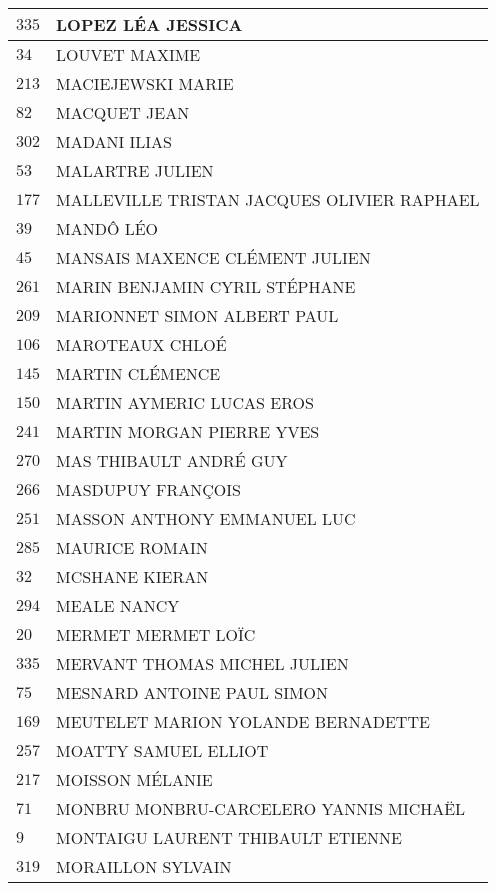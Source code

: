 \begin{xltabular}{\linewidth}{|l|X|}
    \hline
    $335$ & LOPEZ LÉA JESSICA \\
    \hline
    $34$ & LOUVET MAXIME \\
    \hline
    $213$ & MACIEJEWSKI MARIE \\
    \hline
    $82$ & MACQUET JEAN \\
    \hline
    $302$ & MADANI ILIAS \\
    \hline
    $53$ & MALARTRE JULIEN \\
    \hline
    $177$ & MALLEVILLE TRISTAN JACQUES OLIVIER RAPHAEL \\
    \hline
    $39$ & MANDÔ LÉO \\
    \hline
    $45$ & MANSAIS MAXENCE CLÉMENT JULIEN \\
    \hline
    $261$ & MARIN BENJAMIN CYRIL STÉPHANE \\
    \hline
    $209$ & MARIONNET SIMON ALBERT PAUL \\
    \hline
    $106$ & MAROTEAUX CHLOÉ \\
    \hline
    $145$ & MARTIN CLÉMENCE \\
    \hline
    $150$ & MARTIN AYMERIC LUCAS EROS \\
    \hline
    $241$ & MARTIN MORGAN PIERRE YVES \\
    \hline
    $270$ & MAS THIBAULT ANDRÉ GUY \\
    \hline
    $266$ & MASDUPUY FRANÇOIS \\
    \hline
    $251$ & MASSON ANTHONY EMMANUEL LUC \\
    \hline
    $285$ & MAURICE ROMAIN \\
    \hline
    $32$ & MCSHANE KIERAN \\
    \hline
    $294$ & MEALE NANCY \\
    \hline
    $20$ & MERMET MERMET LOÏC \\
    \hline
    $335$ & MERVANT THOMAS MICHEL JULIEN \\
    \hline
    $75$ & MESNARD ANTOINE PAUL SIMON \\
    \hline
    $169$ & MEUTELET MARION YOLANDE BERNADETTE \\
    \hline
    $257$ & MOATTY SAMUEL ELLIOT \\
    \hline
    $217$ & MOISSON MÉLANIE \\
    \hline
    $71$ & MONBRU MONBRU-CARCELERO YANNIS MICHAËL \\
    \hline
    $9$ & MONTAIGU LAURENT THIBAULT ETIENNE \\
    \hline
    $319$ & MORAILLON SYLVAIN \\

\end{xltabular}
